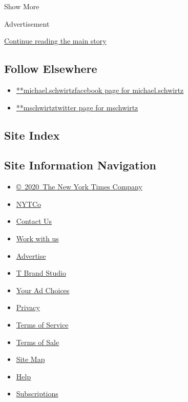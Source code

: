Show More

Advertisement

\protect\hyperlink{after-mid2}{Continue reading the main story}

\hypertarget{follow-elsewhere}{%
\subsection{Follow Elsewhere}\label{follow-elsewhere}}

\begin{itemize}
\tightlist
\item
  \href{https://www.facebook.com/michael.schwirtz}{**michael.schwirtzfacebook
  page for michael.schwirtz}
\item
  \href{https://twitter.com/mschwirtz}{**mschwirtztwitter page for
  mschwirtz}
\end{itemize}

\hypertarget{site-index}{%
\subsection{Site Index}\label{site-index}}

\hypertarget{site-information-navigation}{%
\subsection{Site Information
Navigation}\label{site-information-navigation}}

\begin{itemize}
\tightlist
\item
  \href{https://help.nytimes.com/hc/en-us/articles/115014792127-Copyright-notice}{©~2020~The
  New York Times Company}
\end{itemize}

\begin{itemize}
\tightlist
\item
  \href{https://www.nytco.com/}{NYTCo}
\item
  \href{https://help.nytimes.com/hc/en-us/articles/115015385887-Contact-Us}{Contact
  Us}
\item
  \href{https://www.nytco.com/careers/}{Work with us}
\item
  \href{https://nytmediakit.com/}{Advertise}
\item
  \href{http://www.tbrandstudio.com/}{T Brand Studio}
\item
  \href{https://www.nytimes.com/privacy/cookie-policy\#how-do-i-manage-trackers}{Your
  Ad Choices}
\item
  \href{https://www.nytimes.com/privacy}{Privacy}
\item
  \href{https://help.nytimes.com/hc/en-us/articles/115014893428-Terms-of-service}{Terms
  of Service}
\item
  \href{https://help.nytimes.com/hc/en-us/articles/115014893968-Terms-of-sale}{Terms
  of Sale}
\item
  \href{https://spiderbites.nytimes.com}{Site Map}
\item
  \href{https://help.nytimes.com/hc/en-us}{Help}
\item
  \href{https://www.nytimes.com/subscription?campaignId=37WXW}{Subscriptions}
\end{itemize}
